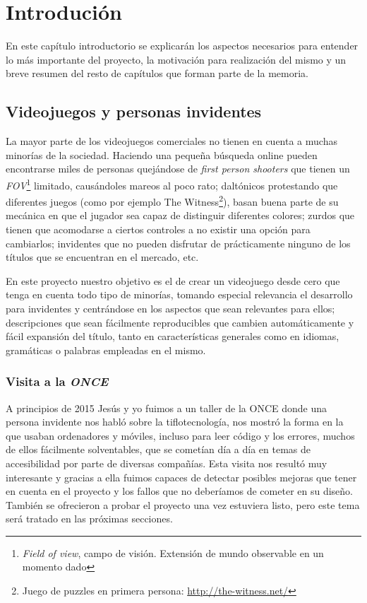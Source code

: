 \chapter[Introdución]{Introdución}

En este capítulo introductorio se explicarán los aspectos necesarios para entender lo más importante del proyecto, la motivación para realización del mismo y un breve resumen del resto de capítulos que forman parte de la memoria.

\section{Videojuegos y personas invidentes}
La mayor parte de los videojuegos comerciales no tienen en cuenta a muchas minorías de la sociedad. Haciendo una pequeña búsqueda online pueden encontrarse miles de personas quejándose de \textit{first person shooters} que tienen un \textit{FOV}\footnote{\textit{Field of view}, campo de visión. Extensión de mundo observable en un momento dado} limitado, causándoles mareos al poco rato; daltónicos protestando que diferentes juegos (como por ejemplo The Witness\footnote{Juego de puzzles en primera persona: \url{http://the-witness.net/}}), basan buena parte de su mecánica en que el jugador sea capaz de distinguir diferentes colores; zurdos que tienen que acomodarse a ciertos controles a no existir una opción para cambiarlos; invidentes que no pueden disfrutar de prácticamente ninguno de los títulos que se encuentran en el mercado, etc.

En este proyecto nuestro objetivo es el de crear un videojuego desde cero que tenga en cuenta todo tipo de minorías, tomando especial relevancia el desarrollo para invidentes y centrándose en los aspectos que sean relevantes para ellos; descripciones que sean fácilmente reproducibles que cambien automáticamente y fácil expansión del título, tanto en características generales como en idiomas, gramáticas o palabras empleadas en el mismo.

\subsection{Visita a la \textit{ONCE}}
A principios de 2015 Jesús y yo fuimos a un taller de la ONCE donde una persona invidente nos habló sobre la tiflotecnología, nos mostró la forma en la que usaban ordenadores y móviles, incluso para leer código y los errores, muchos de ellos fácilmente solventables, que se cometían día a día en temas de accesibilidad por parte de diversas compañías. Esta visita nos resultó muy interesante y gracias a ella fuimos capaces de detectar posibles mejoras que tener en cuenta en el proyecto y los fallos que no deberíamos de cometer en su diseño. También se ofrecieron a probar el proyecto una vez estuviera listo, pero este tema será tratado en las próximas secciones.

